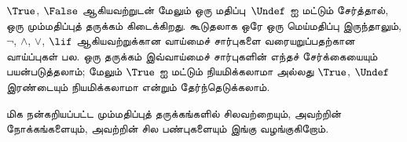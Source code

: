 \documentclass[../../../include/open-logic-section]{subfiles}
\begin{document}


$\True$, $\False$ ஆகியவற்றுடன் மேலும் ஒரு மதிப்பு~$\Undef$ ஐ மட்டும்
சேர்த்தால், ஒரு மும்மதிப்புத் தருக்கம் கிடைக்கிறது. கூடுதலாக ஒரே ஒரு
மெய்மதிப்பு இருந்தாலும், $\lnot$, $\land$, $\lor$, $\lif$ ஆகியவற்றுக்கான
வாய்மைச் சார்புகளை வரையறுப்பதற்கான வாய்ப்புகள் பல. ஒரு தருக்கம் இவ்வாய்மைச்
சார்புகளின் எந்தச் சேர்க்கையையும் பயன்படுத்தலாம்; மேலும் $\True$ ஐ மட்டும்
நியமிக்கலாமா அல்லது $\True$, $\Undef$ இரண்டையும் நியமிக்கலாமா என்றும்
தேர்ந்தெடுக்கலாம்.

மிக நன்கறியப்பட்ட மும்மதிப்புத் தருக்கங்களில் சிலவற்றையும், அவற்றின்
நோக்கங்களையும், அவற்றின் சில பண்புகளையும் இங்கு வழங்குகிறோம்.
\end{document}
